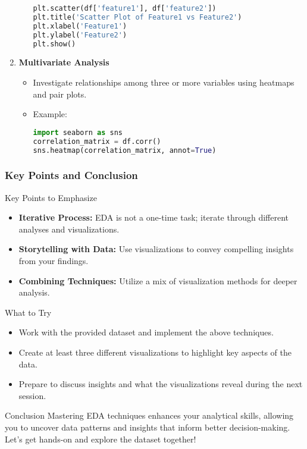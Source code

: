 \documentclass[aspectratio=169]{beamer}
\begin{document}
\begin{frame}[fragile]
\begin{enumerate}
\begin{itemize}
\begin{lstlisting}[language=Python]
plt.scatter(df['feature1'], df['feature2'])
plt.title('Scatter Plot of Feature1 vs Feature2')
plt.xlabel('Feature1')
plt.ylabel('Feature2')
plt.show()
                \end{lstlisting}
            \end{itemize}
        \item \textbf{Multivariate Analysis}
            \begin{itemize}
                \item Investigate relationships among three or more variables using heatmaps and pair plots.
                \item Example:
                \begin{lstlisting}[language=Python]
import seaborn as sns
correlation_matrix = df.corr()
sns.heatmap(correlation_matrix, annot=True)
                \end{lstlisting}
            \end{itemize} 
    \end{enumerate}
\end{frame}

\begin{frame}[fragile]
    \frametitle{Key Points and Conclusion}
    \begin{block}{Key Points to Emphasize}
        \begin{itemize}
            \item \textbf{Iterative Process:} EDA is not a one-time task; iterate through different analyses and visualizations.
            \item \textbf{Storytelling with Data:} Use visualizations to convey compelling insights from your findings.
            \item \textbf{Combining Techniques:} Utilize a mix of visualization methods for deeper analysis.
        \end{itemize}
    \end{block}
    \begin{block}{What to Try}
        \begin{itemize}
            \item Work with the provided dataset and implement the above techniques.
            \item Create at least three different visualizations to highlight key aspects of the data.
            \item Prepare to discuss insights and what the visualizations reveal during the next session.
        \end{itemize}
    \end{block}
    \begin{block}{Conclusion}
        Mastering EDA techniques enhances your analytical skills, allowing you to uncover data patterns and insights that inform better decision-making. Let’s get hands-on and explore the dataset together!
    \end{block}
\end{frame}
\end{document}
